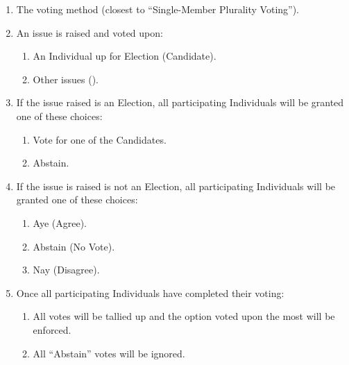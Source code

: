 \begin{enumerate}
	\item The voting method (closest to ``Single-Member Plurality Voting'').

	\item An issue is raised and voted upon:
		\begin{enumerate}
			\item An Individual up for Election (Candidate).

			\item Other issues ().
		\end{enumerate}

	\item If the issue raised is an Election, all participating Individuals will
		be granted one of these choices:
		\begin{enumerate}
			\item Vote for one of the Candidates.

			\item Abstain.
		\end{enumerate}

	\item If the issue is raised is not an Election, all participating Individuals
		will be granted one of these choices:
		\begin{enumerate}
			\item Aye (Agree).

			\item Abstain (No Vote).

			\item Nay (Disagree).
		\end{enumerate}

	\item Once all participating Individuals have completed their voting:
		\begin{enumerate}
			\item All votes will be tallied up and the option voted upon the most will
				be enforced.

			\item All ``Abstain'' votes will be ignored.
		\end{enumerate}
\end{enumerate}

